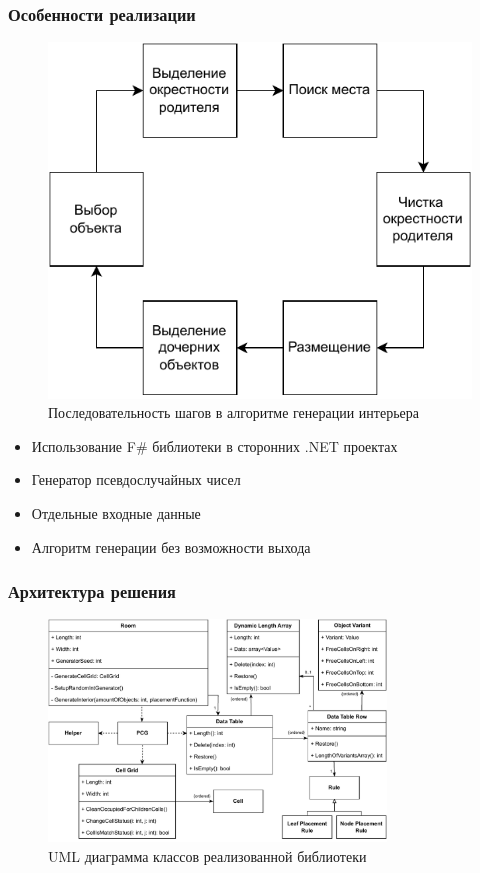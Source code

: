 \documentclass{beamer}
\begin{document}
\begin{frame}
  \frametitle{Особенности реализации}
  \begin{minipage}[m]{0.5\linewidth}
    \begin{figure}
      \centering
        \includegraphics[width=\textwidth]{pictures/pcg.pdf}
        \caption{Последовательность шагов в алгоритме генерации интерьера}
    \end{figure}
    \end{minipage}\hfill
    \begin{minipage}[m]{0.5\linewidth}
      \begin{itemize}
        \item Использование F\# библиотеки в сторонних .NET проектах
        \item Генератор псевдослучайных чисел
        \item Отдельные входные данные
        \item Алгоритм генерации без возможности выхода
      \end{itemize}
    \end{minipage}
\end{frame}

\begin{frame}
  \frametitle{Архитектура решения}
  \begin{figure}
    \centering
    \includegraphics[width=0.8\textwidth]{pictures/uml.pdf}
    \caption{UML диаграмма классов реализованной библиотеки}
  \end{figure}
\end{frame}
\end{document}
